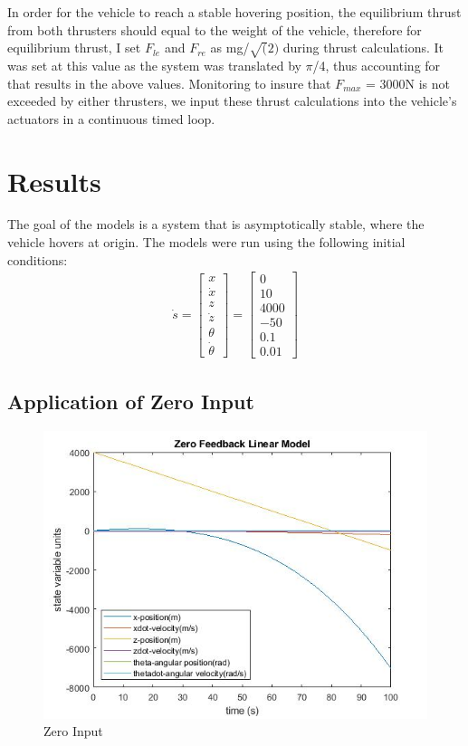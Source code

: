 \documentclass[a4paper,12pt]{article}
\begin{document}
In order for the vehicle to reach a stable hovering position, the equilibrium thrust from both thrusters should equal to the weight of the vehicle, therefore for equilibrium thrust, I set $F_{le}$ and $F_{re}$ as mg/$\sqrt(2)$ during thrust calculations. It was set at this value as the system was translated by $\pi$/4, thus accounting for that results in the above values. Monitoring to insure that $F_{max}$ = 3000N is not exceeded by either thrusters, we input these thrust calculations into the vehicle's actuators in a continuous timed loop.

\section{Results}
The goal of the models is a system that is asymptotically stable, where the vehicle hovers at origin. The models were run using the following initial conditions:
\begin{align*}
\dot{s} = \begin{bmatrix}
x \\ \dot{x} \\ z\\ \dot{z} \\ \theta \\ \dot{\theta}
\end{bmatrix} = \begin{bmatrix}
0 \\ 10 \\ 4000 \\ -50 \\ 0.1 \\ 0.01
\end{bmatrix}
\end{align*}

\subsection{Application of Zero Input}

\begin{figure}[H]
	\centering
	\includegraphics[width=.5\linewidth]{Zeroinput.jpg}
	\caption{Zero Input}
\end{figure}
\end{document}
